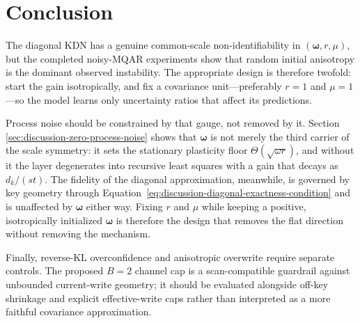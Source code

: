 \documentclass[11pt]{article}
\newcommand{\vct}[1]{\boldsymbol{#1}}
\begin{document}
\section{Conclusion}

The diagonal KDN has a genuine common-scale non-identifiability in
$(\vct{\omega},r,\mu)$, but the completed noisy-MQAR experiments show that random initial
anisotropy is the dominant observed instability. The appropriate design is therefore
twofold: start the gain isotropically, and fix a covariance unit---preferably $r=1$ and
$\mu=1$---so the model learns only uncertainty ratios that affect its predictions.

Process noise should be constrained by that gauge, not removed by it. Section
\ref{sec:discussion-zero-process-noise} shows that $\vct{\omega}$ is not merely the third carrier
of the scale symmetry: it sets the stationary plasticity floor
$\Theta(\sqrt{\omega r})$, and without it the layer degenerates into recursive least squares with
a gain that decays as $d_k/(st)$. The fidelity of the diagonal approximation, meanwhile, is
governed by key geometry through
Equation~\eqref{eq:discussion-diagonal-exactness-condition} and is unaffected by $\vct{\omega}$
either way. Fixing $r$ and $\mu$ while keeping a positive, isotropically initialized
$\vct{\omega}$ is therefore the design that removes the flat direction without removing the
mechanism.

Finally, reverse-KL overconfidence and anisotropic overwrite require separate controls. The
proposed $B=2$ channel cap is a scan-compatible guardrail against unbounded current-write geometry;
it should be evaluated alongside off-key shrinkage and explicit effective-write caps rather than
interpreted as a more faithful covariance approximation.
\end{document}
